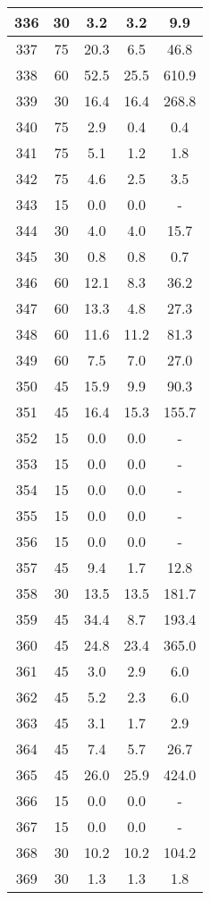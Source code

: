 \documentclass[a4paper,10pt]{article}
\begin{document}
\begin{table}
\begin{tabular}{|c|c|c|c|c|}
\hline
336 & 30 & 3.2 & 3.2 & 9.9 \\
\hline
337 & 75 & 20.3 & 6.5 & 46.8 \\
\hline
338 & 60 & 52.5 & 25.5 & 610.9 \\
\hline
339 & 30 & 16.4 & 16.4 & 268.8 \\
\hline
340 & 75 & 2.9 & 0.4 & 0.4 \\
\hline
341 & 75 & 5.1 & 1.2 & 1.8 \\
\hline
342 & 75 & 4.6 & 2.5 & 3.5 \\
\hline
343 & 15 & 0.0 & 0.0 & - \\
\hline
344 & 30 & 4.0 & 4.0 & 15.7 \\
\hline
345 & 30 & 0.8 & 0.8 & 0.7 \\
\hline
346 & 60 & 12.1 & 8.3 & 36.2 \\
\hline
347 & 60 & 13.3 & 4.8 & 27.3 \\
\hline
348 & 60 & 11.6 & 11.2 & 81.3 \\
\hline
349 & 60 & 7.5 & 7.0 & 27.0 \\
\hline
350 & 45 & 15.9 & 9.9 & 90.3 \\
\hline
351 & 45 & 16.4 & 15.3 & 155.7 \\
\hline
352 & 15 & 0.0 & 0.0 & - \\
\hline
353 & 15 & 0.0 & 0.0 & - \\
\hline
354 & 15 & 0.0 & 0.0 & - \\
\hline
355 & 15 & 0.0 & 0.0 & - \\
\hline
356 & 15 & 0.0 & 0.0 & - \\
\hline
357 & 45 & 9.4 & 1.7 & 12.8 \\
\hline
358 & 30 & 13.5 & 13.5 & 181.7 \\
\hline
359 & 45 & 34.4 & 8.7 & 193.4 \\
\hline
360 & 45 & 24.8 & 23.4 & 365.0 \\
\hline
361 & 45 & 3.0 & 2.9 & 6.0 \\
\hline
362 & 45 & 5.2 & 2.3 & 6.0 \\
\hline
363 & 45 & 3.1 & 1.7 & 2.9 \\
\hline
364 & 45 & 7.4 & 5.7 & 26.7 \\
\hline
365 & 45 & 26.0 & 25.9 & 424.0 \\
\hline
366 & 15 & 0.0 & 0.0 & - \\
\hline
367 & 15 & 0.0 & 0.0 & - \\
\hline
368 & 30 & 10.2 & 10.2 & 104.2 \\
\hline
369 & 30 & 1.3 & 1.3 & 1.8 \\

\end{tabular}
\end{table}
\end{document}
